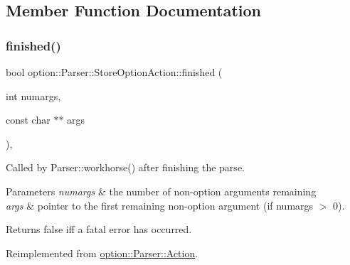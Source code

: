\subsection{Member Function Documentation}
\mbox{\label{classoption_1_1Parser_1_1StoreOptionAction_a617f675ef50a72ae36ce91f065bc8441}} 
\subsubsection{\texorpdfstring{finished()}{finished()}}
{\footnotesize\ttfamily bool option\+::\+Parser\+::\+Store\+Option\+Action\+::finished (\begin{DoxyParamCaption}\item[{int}]{numargs,  }\item[{const char $\ast$$\ast$}]{args }\end{DoxyParamCaption})\hspace{0.3cm}{\ttfamily [inline]}, {\ttfamily [virtual]}}



Called by Parser\+::workhorse() after finishing the parse. 


\begin{DoxyParams}{Parameters}
{\em numargs} & the number of non-\/option arguments remaining \\
\hline
{\em args} & pointer to the first remaining non-\/option argument (if numargs $>$ 0).\\
\hline
\end{DoxyParams}
\begin{DoxyReturn}{Returns}
{\ttfamily false} iff a fatal error has occurred. 
\end{DoxyReturn}


Reimplemented from \hyperlink{structoption_1_1Parser_1_1Action_a3ec558b51e34d33d116f14587289e032}{option\+::\+Parser\+::\+Action}.

\mbox{\label{classoption_1_1Parser_1_1StoreOptionAction_a8931919fba5516377c202920db2b2f84}} 
